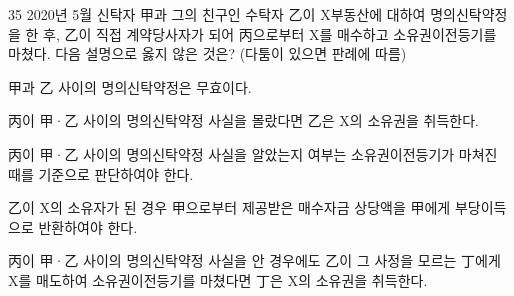 \begin{question}{35}
2020년 5월 신탁자 甲과 그의 친구인 수탁자 乙이 X부동산에 대하여 명의신탁약정을 한 후, 乙이 직접 계약당사자가 되어 丙으로부터 X를 매수하고 소유권이전등기를 마쳤다. 다음 설명으로 옳지 않은 것은? (다툼이 있으면 판례에 따름)
\begin{choices}
  \item 甲과 乙 사이의 명의신탁약정은 무효이다.
  \item 丙이 甲·乙 사이의 명의신탁약정 사실을 몰랐다면 乙은 X의 소유권을 취득한다.
  \item 丙이 甲·乙 사이의 명의신탁약정 사실을 알았는지 여부는 소유권이전등기가 마쳐진 때를 기준으로 판단하여야 한다.
  \item 乙이 X의 소유자가 된 경우 甲으로부터 제공받은 매수자금 상당액을 甲에게 부당이득으로 반환하여야 한다.
  \item 丙이 甲·乙 사이의 명의신탁약정 사실을 안 경우에도 乙이 그 사정을 모르는 丁에게 X를 매도하여 소유권이전등기를 마쳤다면 丁은 X의 소유권을 취득한다.
\end{choices}
\end{question}
